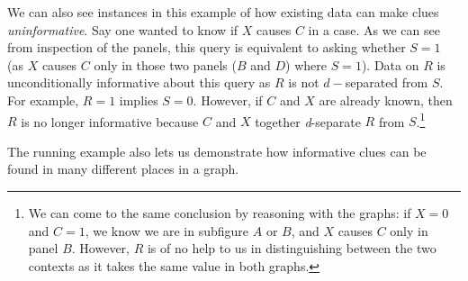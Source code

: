 \documentclass[12pt,]{book}
\let\rmarkdownfootnote\footnote%
\def\footnote{\protect\rmarkdownfootnote}
\begin{document}
We can also see instances in this example of how existing data can make clues \emph{uninformative}. Say one wanted to know if \(X\) causes \(C\) in a case. As we can see from inspection of the panels, this query is equivalent to asking whether \(S=1\) (as \(X\) causes \(C\) only in those two panels (\(B\) and \(D\)) where \(S=1\)). Data on \(R\) is unconditionally informative about this query as \(R\) is not \(d-\)separated from \(S\). For example, \(R=1\) implies \(S=0\). However, if \(C\) and \(X\) are already known, then \(R\) is no longer informative because \(C\) and \(X\) together \emph{d}-separate \(R\) from \(S\).\footnote{We can come to the same conclusion by reasoning with the graphs: if \(X=0\) and \(C=1\), we know we are in subfigure \(A\) or \(B\), and \(X\) causes \(C\) only in panel \(B\). However, \(R\) is of no help to us in distinguishing between the two contexts as it takes the same value in both graphs.}

The running example also lets us demonstrate how informative clues can be found in many different places in a graph.
\end{document}
